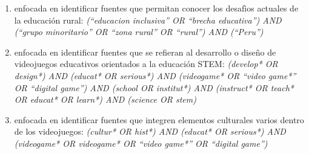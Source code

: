 \begin{enumerate}[label=\textbf{Cadena \arabic*},leftmargin=6em]
    \item enfocada en identificar fuentes que permitan conocer los desafìos actuales de la educación rural: \textit{(``educacion inclusiva'' OR ``brecha educativa'') AND (``grupo minoritario'' OR ``zona rural'' OR ``rural'') AND (``Peru'')}
    \item enfocada en identificar fuentes que se refieran al desarrollo o diseño de videojuegos educativos orientados a la educación STEM: \textit{(develop* OR design*) AND (educat* OR serious*) AND (videogame* OR ``video game*'' OR ``digital game'') AND (school OR institut*) AND (instruct* OR teach* OR educat* OR learn*) AND (science OR stem)}
    \item enfocada en identificar fuentes que integren elementos culturales varios dentro de los videojuegos: \textit{(cultur* OR hist*) AND (educat* OR serious*) AND (videogame* OR videogame* OR ``video game*'' OR ``digital game'')}

\end{enumerate}
